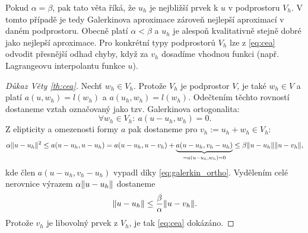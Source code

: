 Pokud $\alpha=\beta$, pak tato věta říká, že $u_h$ je nejbližší prvek k $u$ v podprostoru $V_h$.
V tomto případě je tedy Galerkinova aproximace zároveň nejlepší aproximací v daném podprostoru.
Obecně platí $\alpha<\beta$ a $u_h$ je alespoň kvalitativně stejně dobré jako nejlepší aproximace.
Pro konkrétní typy podprostorů $V_h$ lze z \eqref{eq:cea} odvodit přesnější odhad chyby, když za $v_h$ dosadíme vhodnou funkci (např. Lagrangeovu interpolantu funkce $u$).

\begin{proof}[Důkaz Věty \ref{th:cea}]
Nechť $w_h\in V_h$. Protože $V_h$ je podprostor $V$, je také $w_h\in V$ a platí $a(u,w_h) = l(w_h)$ a $a(u_h,w_h)=l(w_h)$.
Odečtením těchto rovností dostaneme vztah označovaný jako tzv. Galerkinova ortogonalita:
\begin{equation}\label{eq:galerkin_ortho}
\forall w_h\in V_h:~a(u-u_h,w_h)=0.
\end{equation}
Z elipticity a omezenosti formy $a$ pak dostaneme pro $v_h:=u_h+w_h\in V_h$:
\[ \alpha\|u-u_h\|^2 \le a(u-u_h,u-u_h) = a(u-u_h,u-v_h) + \underbrace{a(u-u_h,v_h-u_h)}_{=a(u-u_h,w_h)=0} \le \beta\|u-u_h\|\|u-v_h\|, \]
kde člen $a(u-u_h,v_h-u_h)$ vypadl díky \eqref{eq:galerkin_ortho}.
Vydělením celé nerovnice výrazem $\alpha\|u-u_h\|$ dostaneme
\[ \|u-u_h\| \le \frac\beta\alpha\|u-v_h\|. \]
Protože $v_h$ je libovolný prvek z $V_h$, je tak \eqref{eq:cea} dokázáno.
\end{proof}

